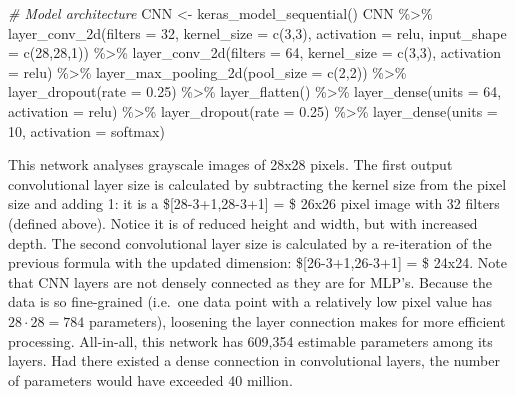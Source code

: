 \documentclass[
]{article}
\newenvironment{Shaded}{\begin{snugshade}}{\end{snugshade}}
\newcommand{\AttributeTok}[1]{\textcolor[rgb]{0.77,0.63,0.00}{#1}}
\newcommand{\CommentTok}[1]{\textcolor[rgb]{0.56,0.35,0.01}{\textit{#1}}}
\newcommand{\DecValTok}[1]{\textcolor[rgb]{0.00,0.00,0.81}{#1}}
\newcommand{\FloatTok}[1]{\textcolor[rgb]{0.00,0.00,0.81}{#1}}
\newcommand{\FunctionTok}[1]{\textcolor[rgb]{0.00,0.00,0.00}{#1}}
\newcommand{\NormalTok}[1]{#1}
\newcommand{\OtherTok}[1]{\textcolor[rgb]{0.56,0.35,0.01}{#1}}
\newcommand{\SpecialCharTok}[1]{\textcolor[rgb]{0.00,0.00,0.00}{#1}}
\newcommand{\StringTok}[1]{\textcolor[rgb]{0.31,0.60,0.02}{#1}}
\begin{document}
\begin{Shaded}
\begin{Highlighting}[]
\CommentTok{\# Model architecture}
\NormalTok{CNN }\OtherTok{\textless{}{-}} \FunctionTok{keras\_model\_sequential}\NormalTok{()}
\NormalTok{       CNN }\SpecialCharTok{\%\textgreater{}\%}
       \FunctionTok{layer\_conv\_2d}\NormalTok{(}\AttributeTok{filters =} \DecValTok{32}\NormalTok{,}
                    \AttributeTok{kernel\_size =} \FunctionTok{c}\NormalTok{(}\DecValTok{3}\NormalTok{,}\DecValTok{3}\NormalTok{),}
                    \AttributeTok{activation =} \StringTok{\textquotesingle{}relu\textquotesingle{}}\NormalTok{,}
                    \AttributeTok{input\_shape =} \FunctionTok{c}\NormalTok{(}\DecValTok{28}\NormalTok{,}\DecValTok{28}\NormalTok{,}\DecValTok{1}\NormalTok{)) }\SpecialCharTok{\%\textgreater{}\%}
       \FunctionTok{layer\_conv\_2d}\NormalTok{(}\AttributeTok{filters =} \DecValTok{64}\NormalTok{,}
                    \AttributeTok{kernel\_size =} \FunctionTok{c}\NormalTok{(}\DecValTok{3}\NormalTok{,}\DecValTok{3}\NormalTok{),}
                    \AttributeTok{activation =} \StringTok{\textquotesingle{}relu\textquotesingle{}}\NormalTok{) }\SpecialCharTok{\%\textgreater{}\%}
       \FunctionTok{layer\_max\_pooling\_2d}\NormalTok{(}\AttributeTok{pool\_size =} \FunctionTok{c}\NormalTok{(}\DecValTok{2}\NormalTok{,}\DecValTok{2}\NormalTok{)) }\SpecialCharTok{\%\textgreater{}\%}
       \FunctionTok{layer\_dropout}\NormalTok{(}\AttributeTok{rate =} \FloatTok{0.25}\NormalTok{) }\SpecialCharTok{\%\textgreater{}\%}
       \FunctionTok{layer\_flatten}\NormalTok{() }\SpecialCharTok{\%\textgreater{}\%}
       \FunctionTok{layer\_dense}\NormalTok{(}\AttributeTok{units =} \DecValTok{64}\NormalTok{, }\AttributeTok{activation =} \StringTok{\textquotesingle{}relu\textquotesingle{}}\NormalTok{) }\SpecialCharTok{\%\textgreater{}\%}
       \FunctionTok{layer\_dropout}\NormalTok{(}\AttributeTok{rate =} \FloatTok{0.25}\NormalTok{) }\SpecialCharTok{\%\textgreater{}\%}
       \FunctionTok{layer\_dense}\NormalTok{(}\AttributeTok{units =} \DecValTok{10}\NormalTok{, }\AttributeTok{activation =} \StringTok{\textquotesingle{}softmax\textquotesingle{}}\NormalTok{)}
\end{Highlighting}
\end{Shaded}

This network analyses grayscale images of 28x28 pixels. The first output
convolutional layer size is calculated by subtracting the kernel size
from the pixel size and adding 1: it is a \${[}28-3+1,28-3+1{]} = \$
26x26 pixel image with 32 filters (defined above). Notice it is of
reduced height and width, but with increased depth. The second
convolutional layer size is calculated by a re-iteration of the previous
formula with the updated dimension: \${[}26-3+1,26-3+1{]} = \$ 24x24.
Note that CNN layers are not densely connected as they are for MLP's.
Because the data is so fine-grained (i.e.~one data point with a
relatively low pixel value has \(28 \cdot 28 = 784\) parameters),
loosening the layer connection makes for more efficient processing.
All-in-all, this network has 609,354 estimable parameters among its
layers. Had there existed a dense connection in convolutional layers,
the number of parameters would have exceeded 40 million.
\end{document}
